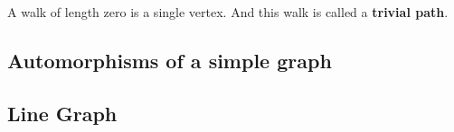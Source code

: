\begin{remark}
	A walk of length zero is a single vertex. And this walk is called a \textbf{trivial path}.
\end{remark}

\subsection{Automorphisms of a simple graph}

\subsection{Line Graph}

